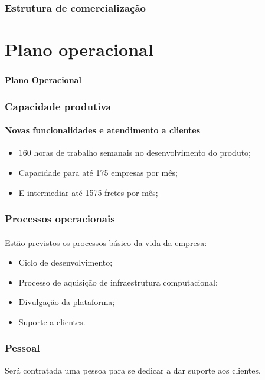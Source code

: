 \documentclass{beamer}
\begin{document}
\begin{frame}
  \frametitle{Estrutura de comercialização}
  \framesubtitle{}

\end{frame}

\section{Plano operacional}
\begin{frame}
  \frametitle{}
  \framesubtitle{}

  \begin{center}
    {\huge\textbf{Plano Operacional}}
  \end{center}
\end{frame}

\begin{frame}
  \frametitle{Capacidade produtiva}
  \framesubtitle{Novas funcionalidades e atendimento a clientes}

  \begin{itemize}
    \item 160 horas de trabalho semanais no desenvolvimento do produto;
    \item Capacidade para até 175 empresas por mês;
    \item E intermediar até 1575 fretes por mês;
  \end{itemize}

\end{frame}

\begin{frame}
  \frametitle{Processos operacionais}
  \framesubtitle{}

  Estão previstos os processos básico da vida da empresa:
  \begin{itemize}
    \item Ciclo de desenvolvimento;
    \item Processo de aquisição de infraestrutura computacional;
    \item Divulgação da plataforma;
    \item Suporte a clientes.
  \end{itemize}

\end{frame}

\begin{frame}
  \frametitle{Pessoal}

  Será contratada uma pessoa para se dedicar a dar suporte aos clientes.

\end{frame}
\end{document}
